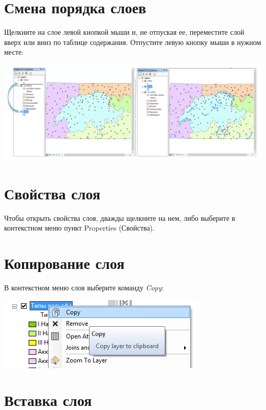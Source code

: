 \documentclass[12pt,]{book}
\begin{document}
\hypertarget{section-12}{%
\section{Смена порядка слоев}\label{section-12}}

Щелкните на слое левой кнопкой мыши и, не отпуская ее, переместите слой вверх или вниз по таблице содержания. Отпустите левую кнопку мыши в нужном месте:

\includegraphics{images/Appendix/image10.png}

\hypertarget{section-13}{%
\section{Свойства слоя}\label{section-13}}

Чтобы открыть свойства слоя, дважды щелкните на нем, либо выберите в контекстном меню пункт Properties (Свойства).

\hypertarget{section-14}{%
\section{Копирование слоя}\label{section-14}}

В контекстном меню слоя выберите команду \emph{Copy}:

\includegraphics{images/Appendix/image11.png}

\hypertarget{section-15}{%
\section{Вставка слоя}\label{section-15}}
\end{document}
